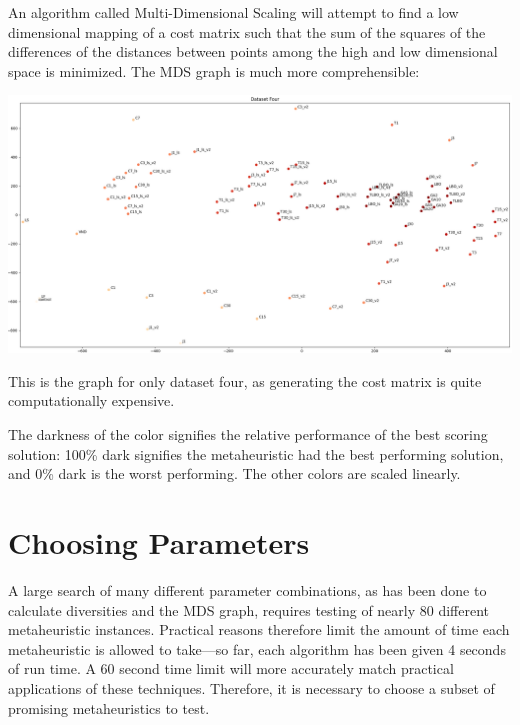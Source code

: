 \documentclass[11pt, letterpaper, onecolumn]{article}
\begin{document}
\begin{table}[htbp]
\end{table}

An algorithm called Multi-Dimensional Scaling will attempt to find a low dimensional mapping of a cost matrix such that the sum of the squares of the differences of the distances between points among the high and low dimensional space is minimized. The MDS graph is much more comprehensible:

\includegraphics[width=\linewidth]{graphs/ds4_matrix.png}

This is the graph for only dataset four, as generating the cost matrix is quite computationally expensive. 

The darkness of the color signifies the relative performance of the best scoring solution: 100\% dark signifies the metaheuristic had the best performing solution, and 0\% dark is the worst performing. The other colors are scaled linearly.  

\section{Choosing Parameters}

A large search of many different parameter combinations, as has been done to calculate diversities and the MDS graph, requires testing of nearly 80 different metaheuristic instances. Practical reasons therefore limit the amount of time each metaheuristic is allowed to take---so far, each algorithm has been given 4 seconds of run time. A 60 second time limit will more accurately match practical applications of these techniques. Therefore, it is necessary to choose a subset of promising metaheuristics to test. 
\end{document}
